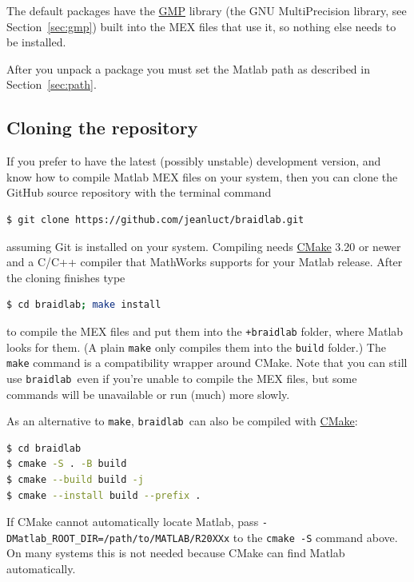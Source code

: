 \documentclass[12pt]{article}
\newcommand{\braidlab}{\texttt{braidlab}}%
\begin{document}
%
The default packages have the \href{https://gmplib.org/}{GMP} library (the
GNU MultiPrecision library, see Section~\ref{sec:gmp}) built into the MEX
files that use it, so nothing else needs to be installed.

After you unpack a package you must set the Matlab path as described in
Section~\ref{sec:path}.


\subsection{Cloning the repository}
\label{sec:cloning}

 If you prefer to have the latest (possibly unstable) development
version, and know how to compile Matlab MEX %
 files on your system, then you can clone the GitHub
source repository with the terminal command
\begin{lstlisting}[frame=single,framerule=0pt,escapechar=*,%
  language=bash,backgroundcolor=\color{white}]
$ git clone https://github.com/jeanluct/braidlab.git
\end{lstlisting}
assuming Git is installed on your system.  Compiling needs
\href{https://cmake.org/}{CMake} 3.20 or newer and a C/C++ compiler that
MathWorks supports for your Matlab release.  After the cloning finishes type
\begin{lstlisting}[frame=single,framerule=0pt,escapechar=*,%
  language=bash,backgroundcolor=\color{white}]
$ cd braidlab; make install
\end{lstlisting}
to compile the MEX files and put them into the \lstinline{+braidlab} folder,
where Matlab looks for them.  (A plain \lstinline{make} only compiles them
into the \lstinline{build} folder.)  The \lstinline{make} command is a
compatibility wrapper around CMake.  Note that you can still use
\braidlab\ even if
you're unable to compile the MEX files, but some commands will be unavailable
or run (much) more slowly. %

As an alternative to \lstinline{make}, \braidlab\ can also be compiled with
\href{https://cmake.org/}{CMake}:
\begin{lstlisting}[frame=single,framerule=0pt,escapechar=*,%
  language=bash,backgroundcolor=\color{white}]
$ cd braidlab
$ cmake -S . -B build
$ cmake --build build -j
$ cmake --install build --prefix .
\end{lstlisting}
If CMake cannot automatically locate Matlab, pass
\lstinline{-DMatlab_ROOT_DIR=/path/to/MATLAB/R20XXx} to the
\lstinline{cmake -S} command above.
On many systems this is not needed because CMake can find Matlab
automatically.
\end{document}
